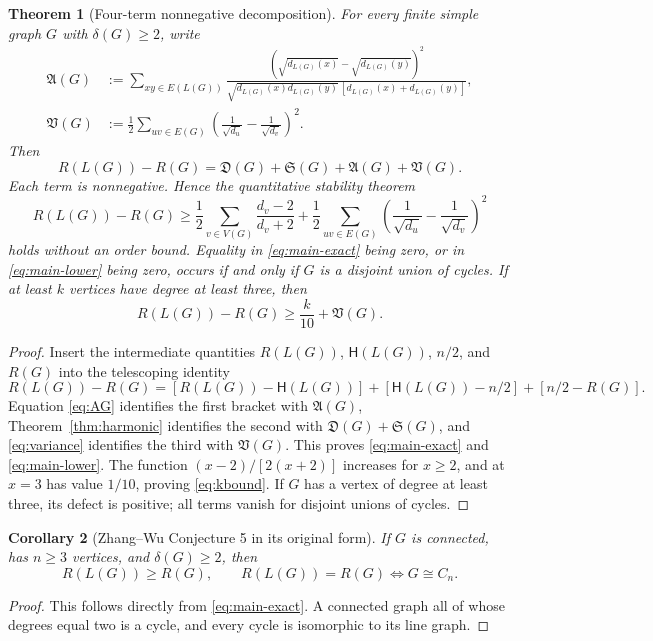 \documentclass[11pt,a4paper]{article}
\newtheorem{theorem}{Theorem}[section]
\newtheorem{corollary}[theorem]{Corollary}
\theoremstyle{remark}
\newcommand{\Def}{\mathfrak D}
\newcommand{\Sl}{\mathfrak S}
\newcommand{\Ag}{\mathfrak A}
\newcommand{\Var}{\mathfrak V}
\newcommand{\HH}{\mathsf H}
\begin{document}
\begin{theorem}[Four-term nonnegative decomposition]\label{thm:four}
For every finite simple graph $G$ with $\delta(G)\ge2$, write
\begin{align*}
 \Ag(G)&:=\sum_{xy\in E(L(G))}\frac{(\sqrt{d_{L(G)}(x)}-\sqrt{d_{L(G)}(y)})^2}
 {\sqrt{d_{L(G)}(x)d_{L(G)}(y)}\,[d_{L(G)}(x)+d_{L(G)}(y)]},\\
 \Var(G)&:=\frac12\sum_{uv\in E(G)}\left(\frac1{\sqrt{d_u}}-\frac1{\sqrt{d_v}}\right)^2.
\end{align*}
Then
\begin{equation}\label{eq:main-exact}
 \boxed{R(L(G))-R(G)=\Def(G)+\Sl(G)+\Ag(G)+\Var(G).}
\end{equation}
Each term is nonnegative. Hence the quantitative stability theorem
\begin{equation}\label{eq:main-lower}
 \boxed{R(L(G))-R(G)\ge\frac12\sum_{v\in V(G)}\frac{d_v-2}{d_v+2}
 +\frac12\sum_{uv\in E(G)}\left(\frac1{\sqrt{d_u}}-\frac1{\sqrt{d_v}}\right)^2}
\end{equation}
holds without an order bound. Equality in \eqref{eq:main-exact} being zero, or in \eqref{eq:main-lower} being zero, occurs if and only if $G$ is a disjoint union of cycles. If at least $k$ vertices have degree at least three, then
\begin{equation}\label{eq:kbound}
 R(L(G))-R(G)\ge \frac{k}{10}+\Var(G).
\end{equation}
\end{theorem}
\begin{proof}
Insert the intermediate quantities $R(L(G))$, $\HH(L(G))$, $n/2$, and $R(G)$ into the telescoping identity
\[
 R(L(G))-R(G)=[R(L(G))-\HH(L(G))]
 +[\HH(L(G))-n/2]+[n/2-R(G)].
\]
Equation \eqref{eq:AG} identifies the first bracket with $\Ag(G)$, Theorem~\ref{thm:harmonic} identifies the second with $\Def(G)+\Sl(G)$, and \eqref{eq:variance} identifies the third with $\Var(G)$. This proves \eqref{eq:main-exact} and \eqref{eq:main-lower}. The function $(x-2)/[2(x+2)]$ increases for $x\ge2$, and at $x=3$ has value $1/10$, proving \eqref{eq:kbound}. If $G$ has a vertex of degree at least three, its defect is positive; all terms vanish for disjoint unions of cycles.
\end{proof}

\begin{corollary}[Zhang--Wu Conjecture 5 in its original form]\label{cor:ZW}
If $G$ is connected, has $n\ge3$ vertices, and $\delta(G)\ge2$, then
\[
 \boxed{R(L(G))\ge R(G),\qquad
 R(L(G))=R(G)\iff G\cong C_n.}
\]
\end{corollary}
\begin{proof}
This follows directly from \eqref{eq:main-exact}. A connected graph all of whose degrees equal two is a cycle, and every cycle is isomorphic to its line graph.
\end{proof}
\end{document}
